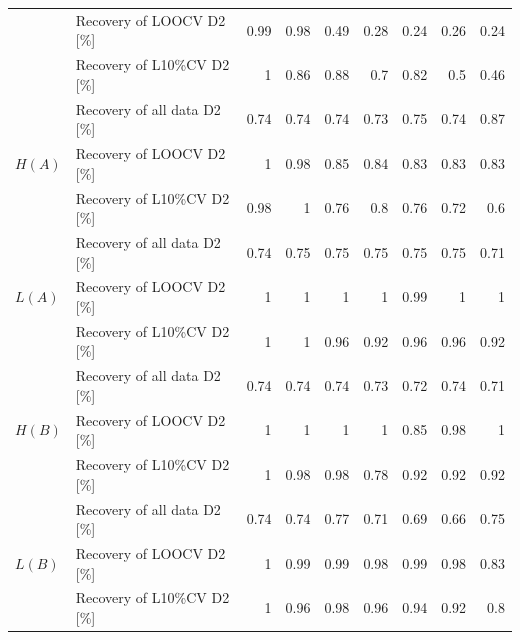 \documentclass[11pt,oneside,czech,american]{book} %
\theoremstyle{plain}
\theoremstyle{definition}
\begin{document}
\begin{table}[H]
\begin{tabular}{llrrrrrrr}
	& Recovery of LOOCV D2 [\%]    & 0.99          & 0.98          & 0.49          & 0.28         & 0.24          & 0.26          & 0.24           \\
	& Recovery of L10\%CV D2 [\%]  & 1             & 0.86          & 0.88          & 0.7          & 0.82          & 0.5           & 0.46           \\ 
	\hline
	\multirow{3}{*}{$H(A)$}    & Recovery of all data D2 [\%] & 0.74          & 0.74          & 0.74          & 0.73         & 0.75          & 0.74          & 0.87           \\
	& Recovery of LOOCV D2 [\%]    & 1             & 0.98          & 0.85          & 0.84         & 0.83          & 0.83          & 0.83           \\
	& Recovery of L10\%CV D2 [\%]  & 0.98          & 1             & 0.76          & 0.8          & 0.76          & 0.72          & 0.6            \\ 
	\hline
	\multirow{3}{*}{$L(A)$}    & Recovery of all data D2 [\%] & 0.74          & 0.75          & 0.75          & 0.75         & 0.75          & 0.75          & 0.71           \\
	& Recovery of LOOCV D2 [\%]    & 1             & 1             & 1             & 1            & 0.99          & 1             & 1              \\
	& Recovery of L10\%CV D2 [\%]  & 1             & 1             & 0.96          & 0.92         & 0.96          & 0.96          & 0.92           \\ 
	\hline
	\multirow{3}{*}{$H(B)$}    & Recovery of all data D2 [\%] & 0.74          & 0.74          & 0.74          & 0.73         & 0.72          & 0.74          & 0.71           \\
	& Recovery of LOOCV D2 [\%]    & 1             & 1             & 1             & 1            & 0.85          & 0.98          & 1              \\
	& Recovery of L10\%CV D2 [\%]  & 1             & 0.98          & 0.98          & 0.78         & 0.92          & 0.92          & 0.92           \\ 
	\hline
	\multirow{3}{*}{$L(B)$}    & Recovery of all data D2 [\%] & 0.74          & 0.74          & 0.77          & 0.71         & 0.69          & 0.66          & 0.75           \\
	& Recovery of LOOCV D2 [\%]    & 1             & 0.99          & 0.99          & 0.98         & 0.99          & 0.98          & 0.83           \\
	& Recovery of L10\%CV D2 [\%]  & 1             & 0.96          & 0.98          & 0.96         & 0.94          & 0.92          & 0.8            \\ 

\end{tabular}
\end{table}
\end{document}
